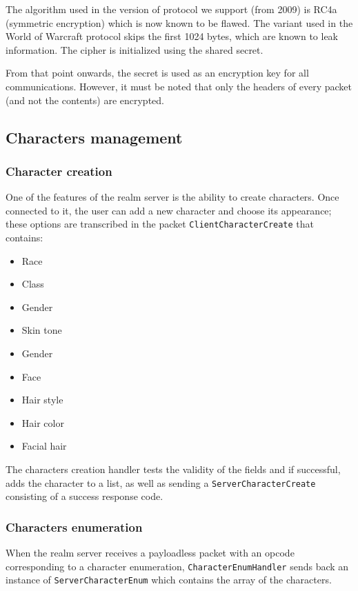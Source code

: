 \documentclass[paper=a4, fontsize=11pt]{scrartcl}
\begin{document}
The algorithm used in the version of protocol we support (from
2009) is RC4a (symmetric encryption) which is now known to be flawed.
The variant used in the World of Warcraft protocol skips the first 1024 bytes,
which are known to leak information.
The cipher is initialized using the shared secret.

From that point onwards, the secret is used as an encryption key for all
communications.
However, it must be noted that only the headers of every packet
(and not the contents) are encrypted.

\subsection{Characters management}

\subsubsection{Character creation}

One of the features of the realm server is the ability to create characters.
Once connected to it, the user can add a new character and choose its appearance; 
these options are transcribed in the packet \texttt{ClientCharacterCreate} that
contains:
\begin{multicols}{2}
\begin{itemize}
    \item Race
    \item Class
    \item Gender
    \item Skin tone
    \item Gender
    \item Face
    \item Hair style
    \item Hair color
    \item Facial hair
\end{itemize}
\end{multicols}

The characters creation handler tests the validity of the fields and if successful,
adds the character to a list, as well as sending a \texttt{ServerCharacterCreate}
consisting of a success response code.

\subsubsection{Characters enumeration}

When the realm server receives a payloadless packet with an opcode corresponding
to a character enumeration, \texttt{CharacterEnumHandler} sends back an instance
of \texttt{ServerCharacterEnum} which contains the array of the characters.
\end{document}
